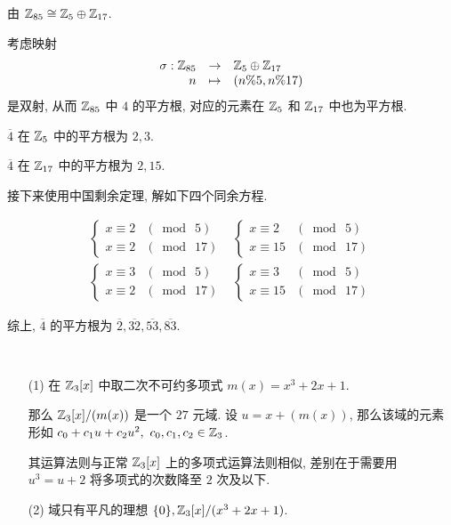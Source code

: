 \begin{solution}
	
由 $\mathbb Z_{85}\cong \mathbb Z_{5}\oplus\mathbb Z_{17}$.

考虑映射 $$\begin{array}{rcl}
	\sigma: \mathbb Z_{85}&\to&\mathbb Z_5\oplus\mathbb Z_{17}\\
	n&\mapsto&(n\%5,n\%17)
\end{array}$$
是双射, 从而 $\mathbb Z_{85}$ 中 $4$ 的平方根, 对应的元素在 $\mathbb Z_5$ 和 $\mathbb Z_{17}$ 中也为平方根.

$\overline{4}$ 在 $\mathbb Z_{5}$ 中的平方根为 $2,3$.

$\overline{4}$ 在 $\mathbb Z_{17}$ 中的平方根为 $2,15$.

接下来使用中国剩余定理, 解如下四个同余方程.

$$\begin{array}{lr}
	\left\{\begin{array}{ll}
		x\equiv 2 & (\bmod\ 5) \\
		x\equiv 2 & (\bmod\ 17)
	\end{array}\right.
	&
	\left\{\begin{array}{ll}
		x\equiv 2 & (\bmod\ 5) \\
		x\equiv 15 & (\bmod\ 17)
	\end{array}\right.
	\\[25pt]
	\left\{\begin{array}{ll}
		x\equiv 3 & (\bmod\ 5) \\
		x\equiv 2 & (\bmod\ 17)
	\end{array}\right.
	&
	\left\{\begin{array}{ll}
		x\equiv 3 & (\bmod\ 5) \\
		x\equiv 15 & (\bmod\ 17)
	\end{array}\right.
\end{array}$$

综上, $\overline{4}$ 的平方根为 $\overline{2},\overline{32},\overline{53},\overline{83}$.

\end{solution}

\problem[题目 5]

\begin{solution}\
	\begin{itemize}
		\item[(1)] 在 $\mathbb Z_3[x]$ 中取二次不可约多项式 $m(x)=x^3+2x+1$.
		
		那么 $\mathbb Z_3[x]/(m(x))$ 是一个 $27$ 元域. 设 $u=x+(m(x))$, 那么该域的元素形如 $c_0+c_1u+c_2u^2,\ c_0,c_1,c_2\in\mathbb Z_3$.
		
		其运算法则与正常 $\mathbb Z_3[x]$ 上的多项式运算法则相似, 差别在于需要用 $u^3=u+2$ 将多项式的次数降至 $2$ 次及以下.
		
		\item[(2)] 域只有平凡的理想 $\{0\},\mathbb Z_3[x]/(x^3+2x+1)$.
	\end{itemize}
\end{solution}

